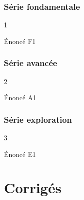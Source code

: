 \documentclass[a4paper,11pt,twoside]{article}
\begin{document}
\subsubsection*{Série fondamentale}
\begin{seqSerieExos}{1}
\setcounter{SerieExosNum}{102}
\setcounter{ExoNum}{0}
\begin{seqExercice}[nom={F1},obj={02}]
Énoncé F1
\end{seqExercice}
\end{seqSerieExos}

\subsubsection*{Série avancée}
\begin{seqSerieExos}{2}
\setcounter{SerieExosNum}{103}
\setcounter{ExoNum}{0}
\begin{seqExercice}[nom={A1},obj={02}]
Énoncé A1
\end{seqExercice}
\end{seqSerieExos}

\subsubsection*{Série exploration}
\begin{seqSerieExos}{3}
\setcounter{SerieExosNum}{104}
\setcounter{ExoNum}{0}
\begin{seqExercice}[nom={E1},obj={02}]
Énoncé E1
\end{seqExercice}
\end{seqSerieExos}

\cleardoublepage
\seqAfficheAnnexes
\cleardoublepage
\section*{Corrigés}
\seqAfficheCorriges
\end{document}

